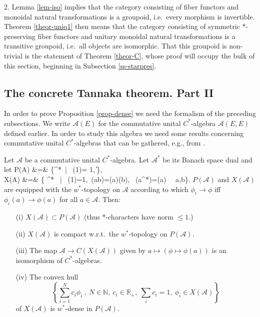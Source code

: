 \documentclass[12pt]{article}
\theoremstyle{definition}
\theoremstyle{definition}
\theoremstyle{remark}
\def\2#1{{\mathcal #1}}
\def\7#1{{\mathbb #1}}
\def\ol#1{{\overline #1}}
\newcommand{\rarr}{\rightarrow}
\newcounter{bean}
\begin{document}
2. Lemma \ref{lem-iso} implies that the category consisting of fiber functors and monoidal natural 
transformations is a groupoid, i.e.\ every morphism is invertible. Theorem \ref{theor-uniq1} then
means that the category consisting of symmetric $*$-preserving fiber functors and unitary monoidal
natural transformations is a transitive groupoid, i.e.\ all objects are isomorphic. That this
groupoid is non-trivial is the statement of Theorem \ref{theor-C}, whose proof will occupy the bulk
of this section, beginning in Subsection \ref{ss-starpres}. 
\erem





\subsection{The concrete Tannaka theorem. Part II} \label{ss-concrete2}
In order to prove Proposition \ref{prop-dense} we need the formalism of the preceding subsections. 
 We write $\2A(E)$ for the commutative unital $C^*$-algebra $\2A(E,E)$ defined earlier. In order to
study this algebra we need some results concerning commutative unital $C^*$-algebras that can be
gathered, e.g., from \cite{ped}.

\btheor \label{theor-cstar}
Let $\2A$ be a commutative unital $C^*$-algebra. Let $\2A^*$ be its Banach space dual and let
\bean P(\2A) &=& \{\phi\in\2A^*\ | \ \phi(1)= 1,\ \|\phi\|\}, \\
   X(\2A) &=& \{ \phi\in\2A^* \ | \ \phi(1)=1,\ \phi(ab)=\phi(a)\phi(b), \ \phi(a^*)=\ol{\phi(a)}
  \ \ \forall a,b\in\2A\}. 
\eean
$P(\2A)$ and $X(\2A)$ are equipped with the $w^*$-topology on $\2A$ according to which
$\phi_\iota\rightarrow\phi$ iff $\phi_\iota(a)\rightarrow\phi(a)$ for all $a\in\2A$. Then:
\begin{itemize}
\item[(i)] $X(\2A)\subset P(\2A)$  (thus $*$-characters have norm $\le 1$.)
\item[(ii)] $X(\2A)$ is compact w.r.t.\ the $w^*$-topology on $P(\2A)$.
\item[(iii)] The map $\2A\rarr C(X(\2A))$ given by $a\mapsto (\phi\mapsto\phi(a))$ is an isomorphism of
  $C^*$-algebras.
\item[(iv)] The convex hull
\[ \left\{ \sum_{i=1}^N c_i \phi_i \ , \ N\in\7N, \ c_i\in\7R_+, \ \sum_ic_i=1, \ \phi_i\in X(\2A) \right\} \]
of $X(\2A)$ is $w^*$-dense in $P(\2A)$.
\end{itemize}
\etheor
\end{document}
